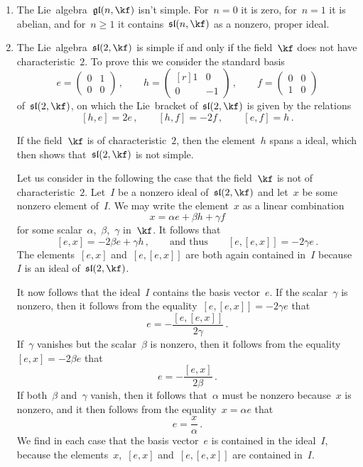 \begin{examples}
	\label{examples for simple lie algebras}
	\leavevmode
	\begin{enumerate}
		\item
			The Lie~algebra~$\gllie(n, \kf)$ isn’t simple.
			For~$n = 0$ it is zero, for~$n = 1$ it is abelian, and for~$n \geq 1$ it contains~$\sllie(n,\kf)$ as a nonzero, proper ideal.
		\item
			The Lie~algebra~$\sllie(2, \kf)$ is simple if and only if the field~$\kf$ does not have characteristic~$2$.
			To prove this we consider the standard basis
			\[
				e
				=
				\begin{pmatrix}
					0 & 1 \\
					0 & 0
				\end{pmatrix} \,,
				\qquad
				h
				=
				\begin{pmatrix*}[r]
					1 &  0  \\
					0 & -1
				\end{pmatrix*} \,,
				\qquad
				f
				=
				\begin{pmatrix}
					0 & 0 \\
					1 & 0
				\end{pmatrix}
			\]
			of~$\sllie(2, \kf)$, on which the Lie~bracket of~$\sllie(2, \kf)$ is given by the relations
			\[
				[h,e] = 2e  \,,
				\qquad
				[h,f] = -2 f \,,
				\qquad
				[e,f] = h \,.
			\]
			
			If the field~$\kf$ is of characteristic~$2$, then the element~$h$ spans a {\onedimensional} ideal, which then shows that~$\sllie(2, \kf)$ is not simple.
			
			Let us consider in the following the case that the field~$\kf$ is not of characteristic~$2$.
			Let~$I$ be a nonzero ideal of~$\sllie(2, \kf)$ and let~$x$ be some nonzero element of~$I$.
			We may write the element~$x$ as a linear combination
			\[
				x = \alpha e + \beta h + \gamma f
			\]
			for some scalar~$\alpha$,~$\beta$,~$\gamma$ in~$\kf$.
			It follows that
			\[
				[e,x]
				=
				-2 \beta e + \gamma h \,,
				\qquad \text{and thus}\qquad
				[e,[e,x]]
				=
				-2 \gamma e \,.
			\]
			The elements~$[e,x]$ and~$[e,[e,x]]$ are both again contained in~$I$ because~$I$ is an ideal of~$\sllie(2, \kf)$.

			It now follows that the ideal~$I$ contains the basis vector~$e$.
			If the scalar~$\gamma$ is nonzero, then it follows from the equality~$[e,[e,x]] = -2 \gamma e$ that
			\[
				e
				=
				- \frac{ [e,[e,x]] }{ 2\gamma } \,.
			\]
			If~$\gamma$ vanishes but the scalar~$\beta$ is nonzero, then it follows from the equality$[e,x] = -2 \beta e$ that
			\[
				e
				=
				-\frac{ [e,x] }{ 2\beta } \,.
			\]
			If both~$\beta$ and~$\gamma$ vanish, then it follows that~$\alpha$ must be nonzero because~$x$ is nonzero, and it then follows from the equality~$x = \alpha e$ that
			\[
				e = \frac{x}{\alpha} \,.
			\]
			We find in each case that the basis vector~$e$ is contained in the ideal~$I$, because the elements~$x$,~$[e,x]$ and~$[e,[e,x]]$ are contained in~$I$.
			

\end{enumerate}
\end{examples}
